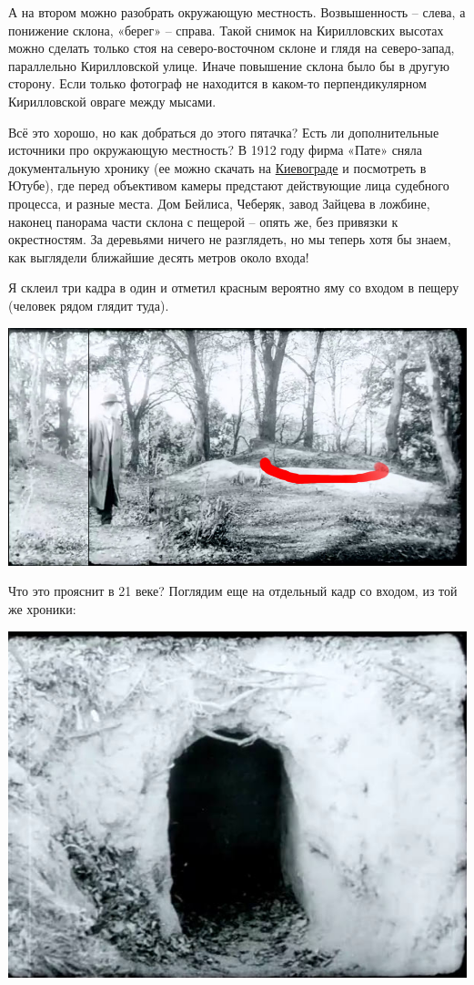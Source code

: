 А на втором можно разобрать окружающую местность. Возвышенность – слева, а понижение склона, «берег» – справа. Такой снимок на Кирилловских высотах можно сделать только стоя на северо-восточном склоне и глядя на северо-запад, параллельно Кирилловской улице. Иначе повышение склона было бы в другую сторону. Если только фотограф не находится в каком-то перпендикулярном Кирилловской овраге между мысами.

Всё это хорошо, но как добраться до этого пятачка? Есть ли дополнительные источники про окружающую местность? В 1912 году фирма «Пате» сняла документальную хронику (ее можно скачать на \href{http://semiletov.org/kievograd/}{Киевограде} и посмотреть в Ютубе), где перед объективом камеры предстают действующие лица судебного процесса, и разные места. Дом Бейлиса, Чеберяк, завод Зайцева в ложбине, наконец панорама части склона с пещерой – опять же, без привязки к окрестностям. За деревьями ничего не разглядеть, но мы теперь хотя бы знаем, как выглядели ближайшие десять метров около входа!

Я склеил три кадра в один и отметил красным вероятно яму со входом в пещеру (человек рядом глядит туда).

\begin{center}
\includegraphics[width=\linewidth]{chast-kirvys/beylis/pesh-comp.jpg}
\end{center}

Что это прояснит в 21 веке? Поглядим еще на отдельный кадр со входом, из той же хроники:

\begin{center}
\includegraphics[width=\linewidth]{chast-kirvys/beylis/vhod.jpg}
\end{center}

